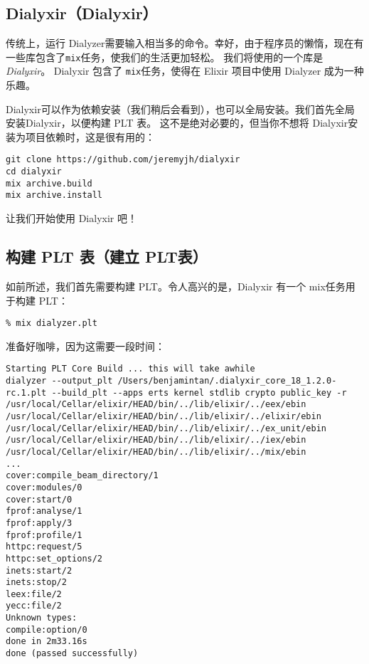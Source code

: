  \subsection{ Dialyxir（Dialyxir）}

传统上，运行 Dialyzer需要输入相当多的命令。幸好，由于程序员的懒惰，现在有一些库包含了\texttt{mix}任务，使我们的生活更加轻松。
我们将使用的一个库是\emph{Dialyxir}。
Dialyxir 包含了 \texttt{mix}任务，使得在 Elixir 项目中使用 Dialyzer 成为一种乐趣。

Dialyxir可以作为依赖安装（我们稍后会看到），也可以全局安装。我们首先全局安装Dialyxir，以便构建 PLT 表。
这不是绝对必要的，但当你不想将 Dialyxir安装为项目依赖时，这是很有用的：

\begin{code}{}\begin{verbatim}
git clone https://github.com/jeremyjh/dialyxir
cd dialyxir
mix archive.build
mix archive.install
\end{verbatim}
\end{code}

让我们开始使用 Dialyxir 吧！

\subsection{构建 PLT 表（建立 PLT表）}

如前所述，我们首先需要构建 PLT。令人高兴的是，Dialyxir 有一个 mix任务用于构建 PLT：

\begin{code}{}
\begin{verbatim}
% mix dialyzer.plt
\end{verbatim}
\end{code}

准备好咖啡，因为这需要一段时间：

\begin{code}{}
\begin{verbatim}
Starting PLT Core Build ... this will take awhile
dialyzer --output_plt /Users/benjamintan/.dialyxir_core_18_1.2.0-rc.1.plt --build_plt --apps erts kernel stdlib crypto public_key -r /usr/local/Cellar/elixir/HEAD/bin/../lib/elixir/../eex/ebin /usr/local/Cellar/elixir/HEAD/bin/../lib/elixir/../elixir/ebin /usr/local/Cellar/elixir/HEAD/bin/../lib/elixir/../ex_unit/ebin /usr/local/Cellar/elixir/HEAD/bin/../lib/elixir/../iex/ebin /usr/local/Cellar/elixir/HEAD/bin/../lib/elixir/../mix/ebin
...
cover:compile_beam_directory/1
cover:modules/0
cover:start/0
fprof:analyse/1
fprof:apply/3
fprof:profile/1
httpc:request/5
httpc:set_options/2
inets:start/2
inets:stop/2
leex:file/2
yecc:file/2
Unknown types:
compile:option/0
done in 2m33.16s
done (passed successfully)
\end{verbatim}
\end{code}


